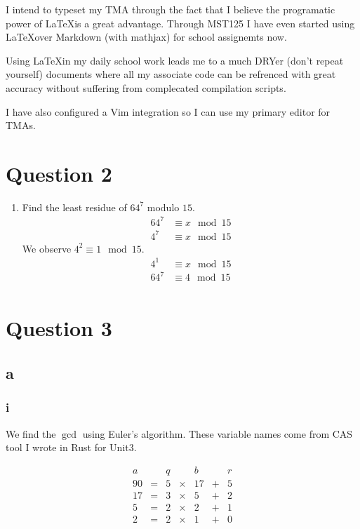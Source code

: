 \documentclass{article}
\begin{document}
I intend to typeset my TMA through the fact that I believe the programatic power of \LaTeX is a great advantage. Through MST125 I have even started using \LaTeX over Markdown (with mathjax) for school assignemts now.

Using \LaTeX in my daily school work leads me to a much DRYer (don't repeat yourself) documents where all my associate code can be refrenced with great accuracy without suffering from complecated compilation scripts.

I have also configured a Vim integration so I can use my primary editor for TMAs.

\section{Question 2}

\begin{enumerate}[label=(\alph*)]
	\item Find the least residue of $64^7$ modulo $15$.
	      \begin{align*}
		      64^7 & \equiv x \mod {15} \\
		      4^7  & \equiv x \mod {15}
	      \end{align*}
	      We observe $4^2 \equiv 1 \mod {15}$.
	      \begin{align*}
		      4^1  & \equiv x \mod {15} \\
		      64^7 & \equiv 4 \mod {15} \\
	      \end{align*}
\end{enumerate}

\section{Question 3}

\subsection{a}

\subsubsection{i}

We find the $\gcd$ using Euler's algorithm. These variable names come from CAS tool I wrote in Rust for Unit3.

$$\begin{matrix}
		a  &   & q &        & b  &   & r \\
		90 & = & 5 & \times & 17 & + & 5 \\
		17 & = & 3 & \times & 5  & + & 2 \\
		5  & = & 2 & \times & 2  & + & 1 \\
		2  & = & 2 & \times & 1  & + & 0
	\end{matrix}$$
\end{document}
